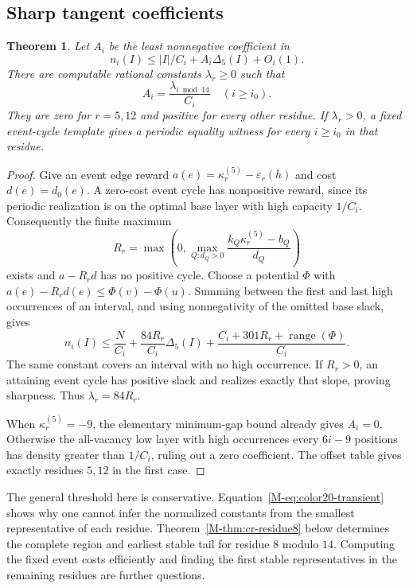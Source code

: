 \documentclass[11pt,reqno]{amsart}
\theoremstyle{plain}
\newtheorem{theorem}{Theorem}
\theoremstyle{plain}
\theoremstyle{plain}
\begin{document}
\subsection{Sharp tangent coefficients}

\begin{theorem}\label{M-thm:eventual-tangent}
Let $A_i$ be the least nonnegative coefficient in
\[
n_i(I)\le |I|/C_i+A_i\Delta_5(I)+O_i(1).
\]
There are computable rational constants $\lambda_r\ge0$ such that
\[
A_i=\frac{\lambda_{i\bmod14}}{C_i}\quad(i\ge i_0).
\]
They are zero for $r=5,12$ and positive for every other residue. If
$\lambda_r>0$, a fixed event-cycle template gives a periodic equality
witness for every $i\ge i_0$ in that residue.
\end{theorem}

\begin{proof}
Give an event edge reward $a(e)=\kappa^{(5)}_r-\varepsilon_r(h)$ and cost
$d(e)=d_0(e)$. A zero-cost event cycle has nonpositive reward, since its
periodic realization is on the optimal base layer with high capacity
$1/C_i$. Consequently the finite maximum
\[
R_r=\max\left(0,\max_{Q:d_Q>0}
\frac{k_Q\kappa^{(5)}_r-b_Q}{d_Q}\right)
\]
exists and $a-R_rd$ has no positive cycle. Choose a potential $\Phi$
with $a(e)-R_rd(e)\le\Phi(v)-\Phi(u)$. Summing between the first and
last high occurrences of an interval, and using nonnegativity of the
omitted base slack, gives
\[
n_i(I)\le\frac{N}{C_i}+\frac{84R_r}{C_i}\Delta_5(I)
 +\frac{C_i+301R_r+\operatorname{range}(\Phi)}{C_i}.
\]
The same constant covers an interval with no high occurrence. If
$R_r>0$, an attaining event cycle has positive slack and realizes exactly
that slope, proving sharpness. Thus $\lambda_r=84R_r$.

When $\kappa^{(5)}_r=-9$, the elementary minimum-gap bound already gives
$A_i=0$. Otherwise the all-vacancy low layer with high occurrences every
$6i-9$ positions has density greater than $1/C_i$, ruling out a zero
coefficient. The offset table gives exactly residues $5,12$ in the first
case.
\end{proof}

The general threshold here is conservative. Equation~\eqref{M-eq:color20-transient}
shows why one cannot infer the normalized constants from the smallest
representative of each residue. Theorem~\ref{M-thm:cr-residue8} below determines
the complete region and earliest stable tail for residue $8$ modulo $14$.
Computing the fixed event costs efficiently and finding the first stable
representatives in the remaining residues are further questions.
\end{document}
